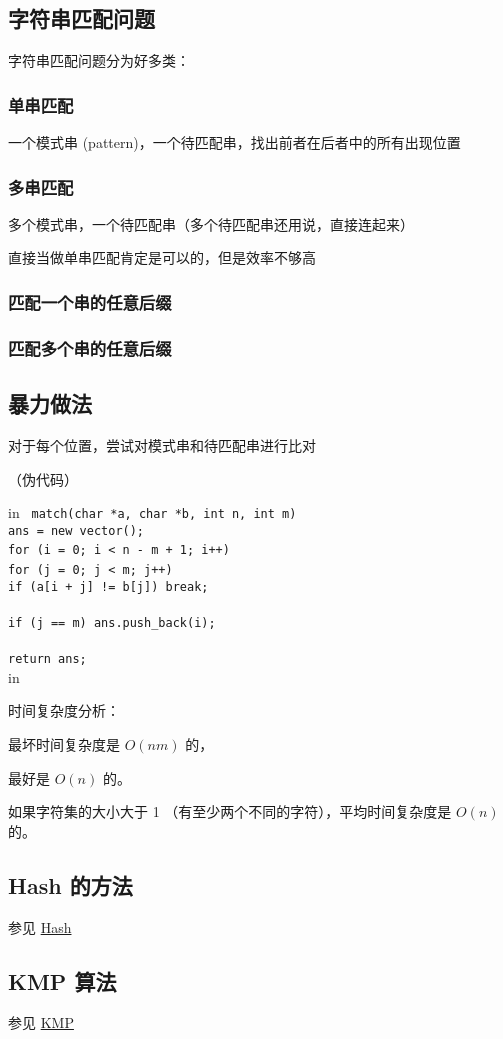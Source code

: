 
\subsection{字符串匹配问题}

字符串匹配问题分为好多类：

\subsubsection{单串匹配}

一个模式串 (pattern)，一个待匹配串，找出前者在后者中的所有出现位置

\subsubsection{多串匹配}

多个模式串，一个待匹配串（多个待匹配串还用说，直接连起来）

直接当做单串匹配肯定是可以的，但是效率不够高

\subsubsection{匹配一个串的任意后缀}

\subsubsection{匹配多个串的任意后缀}

\subsection{暴力做法}

对于每个位置，尝试对模式串和待匹配串进行比对

（伪代码）

 in
\texttt{
match(char *a, char *b, int n, int m) {\\	ans = new vector();\\	for (i = 0; i < n - m + 1; i++) {\\		for (j = 0; j < m; j++) {\\			if (a[i + j] != b[j]) break;\\		}\\		if (j == m) ans.push_back(i);\\	}\\	return ans;\\}}
 in

时间复杂度分析：

最坏时间复杂度是 $O(nm)$ 的，

最好是 $O(n)$ 的。

如果字符集的大小大于 1 （有至少两个不同的字符），平均时间复杂度是 $O(n)$ 的。

\subsection{Hash 的方法}

参见 \href{/string/hash}{Hash}

\subsection{KMP 算法}

参见 \href{/string/kmp}{KMP}
